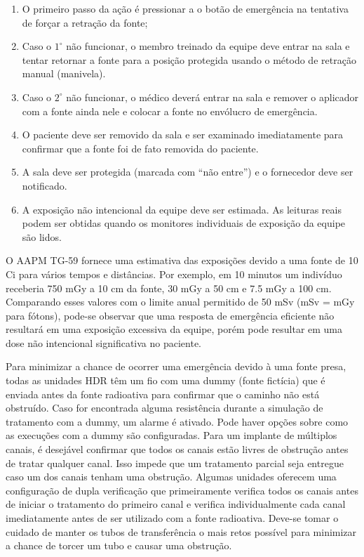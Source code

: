 \documentclass[11pt,a4paper]{article}
\newcounter{exemplo}
\begin{document}
	\begin{enumerate}[label=\textcolor{CarnationPink}{\arabic*${}^\circ$}]
		\item O primeiro passo da ação é pressionar a o botão de emergência na tentativa de forçar a retração da fonte;
		\item Caso o \textcolor{CarnationPink}{$\mathrm{1^{\circ}}$} não funcionar, o membro treinado da equipe deve entrar na sala e tentar retornar a fonte para a posição protegida usando o método de retração manual (manivela).
		\item Caso o \textcolor{CarnationPink}{$\mathrm{2^{\circ}}$} não funcionar, o médico deverá entrar na sala e remover o aplicador com a fonte ainda nele e colocar a fonte no envólucro de emergência.
		\item O paciente deve ser removido da sala e ser examinado imediatamente para confirmar que a fonte foi de fato removida do paciente.
		\item A sala deve ser protegida (marcada com “não entre”) e o fornecedor deve ser notificado.
		\item A exposição não intencional da equipe deve ser estimada. As leituras reais podem ser obtidas quando os monitores individuais de exposição da equipe são lidos.
	\end{enumerate}

	O AAPM TG-59 fornece uma estimativa das exposições devido a uma fonte de 10 Ci para vários tempos e distâncias. Por exemplo, em 10 minutos um indivíduo receberia 750 mGy a 10 cm da fonte, 30 mGy a 50 cm e 7.5 mGy a 100 cm. Comparando esses valores com o limite anual permitido de 50 mSv (mSv = mGy para fótons), pode-se observar que uma resposta de emergência eficiente não resultará em uma exposição excessiva da equipe, porém pode resultar em uma dose não intencional significativa no paciente.

	Para minimizar a chance de ocorrer uma emergência devido à uma fonte presa, todas as unidades HDR têm um fio com uma dummy (fonte fictícia) que é enviada antes da fonte radioativa para confirmar que o caminho não está obstruído. Caso for encontrada alguma resistência durante a simulação de tratamento com a dummy, um alarme é ativado. Pode haver opções sobre como as execuções com a dummy são configuradas. Para um implante de múltiplos canais, é desejável confirmar que todos os canais estão livres de obstrução antes de tratar qualquer canal. Isso impede que um tratamento parcial seja entregue caso um dos canais tenham uma obstrução. Algumas unidades oferecem uma configuração de dupla verificação que primeiramente verifica todos os canais antes de iniciar o tratamento do primeiro canal e verifica individualmente cada canal imediatamente antes de ser utilizado com a fonte radioativa. Deve-se tomar o cuidado de manter os tubos de transferência o mais retos possível para minimizar a chance de torcer um tubo e causar uma obstrução.
\end{document}
